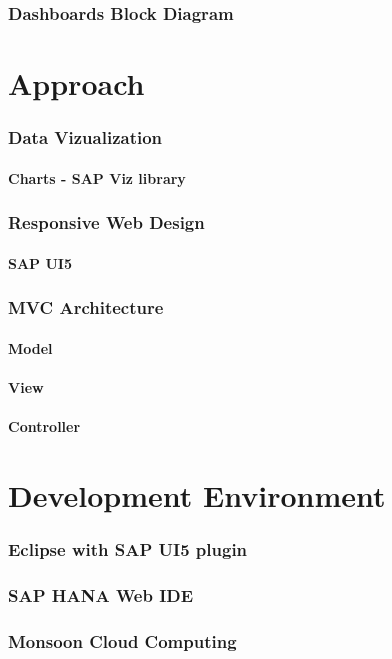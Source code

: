 \documentclass[a4paper, 12pt,oneside]{article}
\begin{document}
\section{Dashboards Block Diagram}


\part{Approach}
\section{Data Vizualization}
\subsection{Charts - SAP Viz library}
\section{Responsive Web Design}
\subsection{SAP UI5}
\section{MVC Architecture}
\subsection{Model}
\subsection{View}
\subsection{Controller}

\part{Development Environment}
\section{Eclipse with SAP UI5 plugin}
\section{SAP HANA Web IDE}
\section{Monsoon Cloud Computing}
\end{document}
